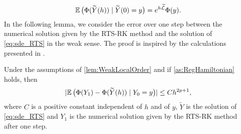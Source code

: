 \documentclass[10pt]{article}
\begin{document}
\begin{equation}
	\operatorname{\mathbb{E}} \big(\Phi(\widetilde Y(h))\mid \widetilde Y(0) = y\big) = e^{h\widetilde {\mathcal{L}}}\Phi(y).
\end{equation}
In the following lemma, we consider the error over one step between the numerical solution given by the RTS-RK method and the solution of \eqref{eq:sde_RTS} in the weak sense. The proof is inspired by the calculations presented in \cite[Section 2.4]{CGS17}.
\begin{lemma}\label{lem:WeakSDELocal} Under the assumptions of \cref{lem:WeakLocalOrder} and if \cref{as:RegHamiltonian} holds, then
	\begin{equation}
		\lvert\operatorname{\mathbb{E}}\big(\Phi(Y_1)- \Phi(\widetilde Y(h))\mid Y_0 = y\big)\rvert \leq C h^{2p+1},
	\end{equation}
	where $C$ is {a} positive constant independent of $h$ and of $y$, $\tilde Y$ is the solution of \eqref{eq:sde_RTS} and $Y_1$ is the numerical solution given by the RTS-RK method after one step.
\end{lemma}
\end{document}
